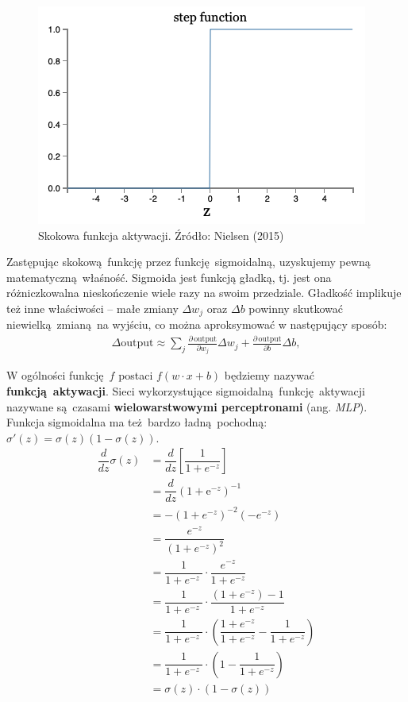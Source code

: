 \documentclass[10pt, oneside]{article}
\theoremstyle{remark}
\begin{document}
\begin{figure}[htpb]
	\centering
	\includegraphics[width=.4\linewidth]{figures/step}
	\caption{Skokowa funkcja aktywacji. Źródło: Nielsen (2015)}
	\label{fig:step}
\end{figure}

Zastępując skokową funkcję przez funkcję sigmoidalną, uzyskujemy pewną matematyczną właśność.
Sigmoida jest funkcją gładką, tj. jest ona różniczkowalna nieskończenie wiele razy na swoim przedziale.
Gładkość implikuje też inne właściwości -- małe zmiany $\Delta w_j$ oraz $\Delta b$ powinny skutkować niewielką zmianą na wyjściu, co można aproksymować w następujący sposób:
\begin{eqnarray} 
  \Delta \mbox{output} \approx \sum_j \frac{\partial \, \mbox{output}}{\partial w_j}
  \Delta w_j + \frac{\partial \, \mbox{output}}{\partial b} \Delta b,
\end{eqnarray}

W ogólności funkcję $f$ postaci $f(w \cdot x + b)$ będziemy nazywać \textbf{funkcją aktywacji}.
Sieci wykorzystujące sigmoidalną funkcję aktywacji nazywane są czasami \textbf{wielowarstwowymi perceptronami} (ang. \emph{MLP}).
Funkcja sigmoidalna ma też bardzo ładną pochodną: $\sigma'(z) = \sigma(z)(1-\sigma(z))$.
\begin{align}
\dfrac{d}{dz} \sigma(z) &= \dfrac{d}{dz} \left[ \dfrac{1}{1 + e^{-z}} \right] \\
&= \dfrac{d}{dz} \left( 1 + \mathrm{e}^{-z} \right)^{-1} \\
&= -(1 + e^{-z})^{-2}(-e^{-z}) \\
&= \dfrac{e^{-z}}{\left(1 + e^{-z}\right)^2} \\
&= \dfrac{1}{1 + e^{-z}\ } \cdot \dfrac{e^{-z}}{1 + e^{-z}}  \\
&= \dfrac{1}{1 + e^{-z}\ } \cdot \dfrac{(1 + e^{-z}) - 1}{1 + e^{-z}}  \\
&= \dfrac{1}{1 + e^{-z}\ } \cdot \left( \dfrac{1 + e^{-z}}{1 + e^{-z}} - \dfrac{1}{1 + e^{-z}} \right) \\
&= \dfrac{1}{1 + e^{-z}\ } \cdot \left( 1 - \dfrac{1}{1 + e^{-z}} \right) \\
&= \sigma(z) \cdot (1 - \sigma(z))
\end{align}
\end{document}
